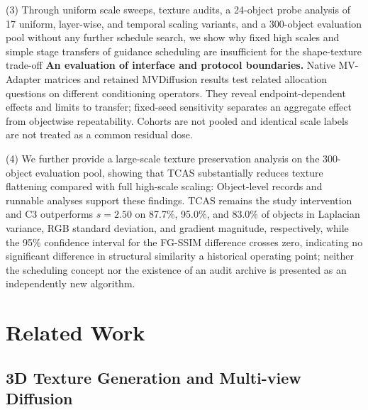 \documentclass[times,twocolumn,final]{elsarticle}
\providecommand{\DIFadd}[1]{{\protect\color{blue} \sf #1}} %
\providecommand{\DIFdel}[1]{{\protect\color{red} \scriptsize #1}} %
\providecommand{\DIFaddbegin}{} %
\providecommand{\DIFaddend}{} %
\providecommand{\DIFdelbegin}{} %
\providecommand{\DIFdelend}{} %
\begin{document}
(3) \DIFdelbegin \DIFdel{Through uniform scale sweeps, texture audits, a 24-object probe analysis of 17 uniform, layer-wise, and temporal scaling variants, and a 300-object evaluation pool without any further schedule search, we show why fixed high scales and simple stage transfers of guidance scheduling are insufficient for the shape-texture trade-off}\DIFdelend \DIFaddbegin \DIFadd{\textbf{An evaluation of interface and protocol boundaries.} Native MV-Adapter matrices and retained MVDiffusion results test related allocation questions on different conditioning operators. They reveal endpoint-dependent effects and limits to transfer; fixed-seed sensitivity separates an aggregate effect from objectwise repeatability. Cohorts are not pooled and identical scale labels are not treated as a common residual dose}\DIFaddend .

\DIFdelbegin \DIFdel{(4) We further provide a large-scale texture preservation analysis on the 300-object evaluation pool, showing that TCAS substantially reduces texture flattening compared with full high-scale scaling: }\DIFdelend \DIFaddbegin \DIFadd{Object-level records and runnable analyses support these findings. TCAS remains the study intervention and }\DIFaddend C3 \DIFdelbegin \DIFdel{outperforms $s = 2.50$ on 87.7\%, 95.0\%, and 83.0\% of objects in Laplacian variance, RGB standard deviation, and gradient magnitude, respectively, while the 95\% confidence interval for the FG-SSIM difference crosses zero, indicating no significant difference in structural similarity}\DIFdelend \DIFaddbegin \DIFadd{a historical operating point; neither the scheduling concept nor the existence of an audit archive is presented as an independently new algorithm}\DIFaddend .

\section{Related Work}
\label{sec:related}

\subsection{3D Texture Generation and Multi-view Diffusion}
\label{subsec:3dtex}
\end{document}

